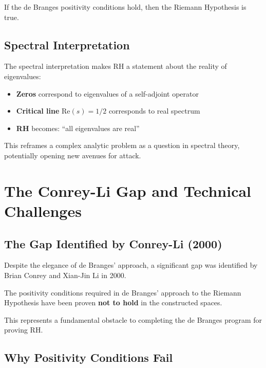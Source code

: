 \begin{theorem}[RH Equivalence]
If the de Branges positivity conditions hold, then the Riemann Hypothesis is true.
\end{theorem}

\subsection{Spectral Interpretation}

The spectral interpretation makes RH a statement about the reality of eigenvalues:

\begin{itemize}
\item \textbf{Zeros} correspond to eigenvalues of a self-adjoint operator
\item \textbf{Critical line} Re$(s) = 1/2$ corresponds to real spectrum
\item \textbf{RH} becomes: ``all eigenvalues are real''
\end{itemize}

This reframes a complex analytic problem as a question in spectral theory, potentially opening new avenues for attack.

\section{The Conrey-Li Gap and Technical Challenges}
\label{sec:conrey-li-gap}

\subsection{The Gap Identified by Conrey-Li (2000)}

Despite the elegance of de Branges' approach, a significant gap was identified by Brian Conrey and Xian-Jin Li in 2000.

\begin{theorem}
\label{thm:conrey-li-gap}
The positivity conditions required in de Branges' approach to the Riemann Hypothesis have been proven \textbf{not to hold} in the constructed spaces.
\end{theorem}

This represents a fundamental obstacle to completing the de Branges program for proving RH.

\subsection{Why Positivity Conditions Fail}

